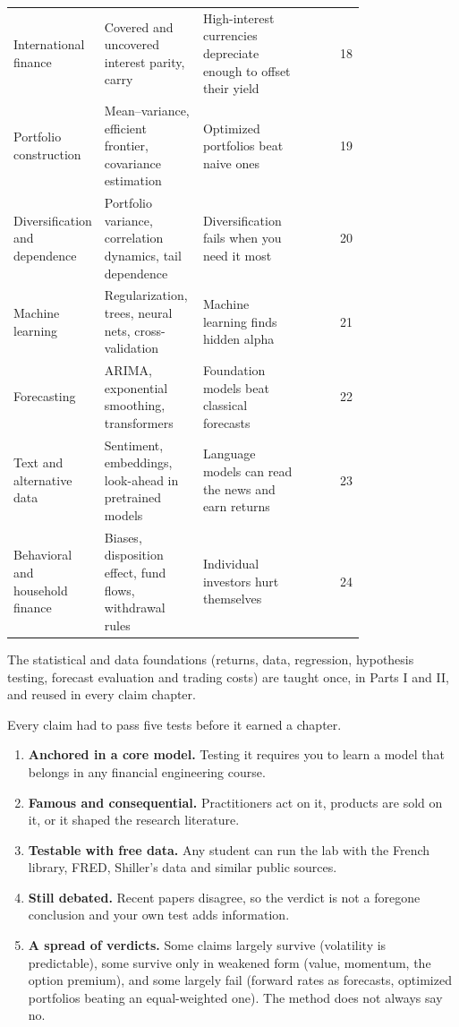 \begin{longtable}{@{}>{\raggedright\arraybackslash}p{0.198\linewidth}>{\raggedright\arraybackslash}p{0.288\linewidth}>{\raggedright\arraybackslash}p{0.297\linewidth}r@{}}
International finance & Covered and uncovered interest parity, carry & High-interest currencies depreciate enough to offset their yield & 18 \\
Portfolio construction & Mean--variance, efficient frontier, covariance estimation & Optimized portfolios beat naive ones & 19 \\
Diversification and dependence & Portfolio variance, correlation dynamics, tail dependence & Diversification fails when you need it most & 20 \\
Machine learning & Regularization, trees, neural nets, cross-validation & Machine learning finds hidden alpha & 21 \\
Forecasting & ARIMA, exponential smoothing, transformers & Foundation models beat classical forecasts & 22 \\
Text and alternative data & Sentiment, embeddings, look-ahead in pretrained models & Language models can read the news and earn returns & 23 \\
Behavioral and household finance & Biases, disposition effect, fund flows, withdrawal rules & Individual investors hurt themselves & 24 \\
\end{longtable}
\endgroup

The statistical and data foundations (returns, data, regression, hypothesis testing, forecast evaluation and trading costs) are taught once, in Parts I and II, and reused in every claim chapter.

Every claim had to pass five tests before it earned a chapter.

\begin{enumerate}
  \item \textbf{Anchored in a core model.} Testing it requires you to learn a model that belongs in any financial engineering course.
  \item \textbf{Famous and consequential.} Practitioners act on it, products are sold on it, or it shaped the research literature.
  \item \textbf{Testable with free data.} Any student can run the lab with the French library, FRED, Shiller's data and similar public sources.
  \item \textbf{Still debated.} Recent papers disagree, so the verdict is not a foregone conclusion and your own test adds information.
  \item \textbf{A spread of verdicts.} Some claims largely survive (volatility is predictable), some survive only in weakened form (value, momentum, the option premium), and some largely fail (forward rates as forecasts, optimized portfolios beating an equal-weighted one). The method does not always say no.
\end{enumerate}

